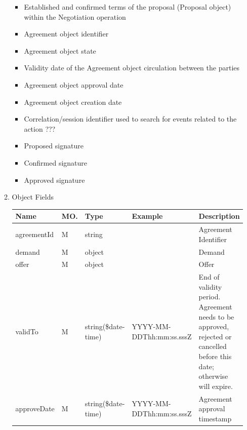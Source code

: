 \begin{enumerate}
\begin{enumerate}
\begin{itemize}
\item Established and confirmed terms of the proposal (Proposal object) within the Negotiation operation

\item Agreement object identifier

\item Agreement object state

\item Validity date of the Agreement object circulation between the parties

\item Agreement object approval date

\item Agreement object creation date

\item Correlation/session identifier used to search for events related to the action ???

\item Proposed signature

\item Confirmed signature

\item Approved signature

\end{itemize}

\item Object Fields

\begin{center}
\begin{tabular}{|p{3cm}|l|p{3cm}|p{3cm}|p{4cm}|} 
\hline
\rowcolor{lightgray}	Name	& MO.	& Type	& Example & 	Description \\
\hline

agreementId			& M & string 				&				& 	Agreement Identifier \\
\hline

demand				& M	& object 				&				& 	Demand		\\
\hline

offer 				& M & object 				& 				& 	Offer 		\\
\hline

validTo				& M & string(\$date-time)	& YYYY-MM-DDThh:mm:ss.sssZ & End of validity period. 
																			Agreement needs to be approved, rejected or cancelled before this date; 
																			otherwise will expire. \\
\hline

approveDate			& M & string(\$date-time)	& YYYY-MM-DDThh:mm:ss.sssZ & Agreement approval timestamp \\
\hline


\end{tabular}
\end{center}
\end{enumerate}
\end{enumerate}

